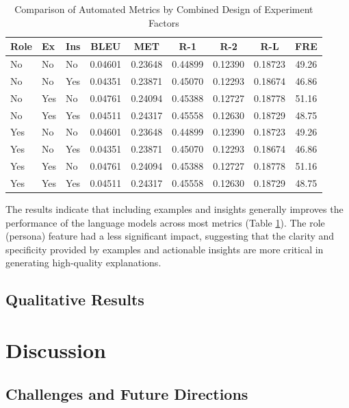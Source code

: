 \documentclass[preprint,12pt]{elsarticle}
\begin{document}
\begin{table}[h]
\centering
\label{table:design_experiment_combined}
\begin{tabular}{|l|l|l|c|c|c|c|c|c|}
\hline
\textbf{Role} & \textbf{Ex} & \textbf{Ins} & \textbf{BLEU} & \textbf{MET} & \textbf{R-1} & \textbf{R-2} & \textbf{R-L} & \textbf{FRE} \\
\hline
No  & No  & No  & 0.04601 & 0.23648 & 0.44899 & 0.12390 & 0.18723 & 49.26 \\
No  & No  & Yes & 0.04351 & 0.23871 & 0.45070 & 0.12293 & 0.18674 & 46.86 \\
No  & Yes & No  & 0.04761 & 0.24094 & 0.45388 & 0.12727 & 0.18778 & 51.16 \\
No  & Yes & Yes & 0.04511 & 0.24317 & 0.45558 & 0.12630 & 0.18729 & 48.75 \\
Yes & No  & No  & 0.04601 & 0.23648 & 0.44899 & 0.12390 & 0.18723 & 49.26 \\
Yes & No  & Yes & 0.04351 & 0.23871 & 0.45070 & 0.12293 & 0.18674 & 46.86 \\
Yes & Yes & No  & 0.04761 & 0.24094 & 0.45388 & 0.12727 & 0.18778 & 51.16 \\
Yes & Yes & Yes & 0.04511 & 0.24317 & 0.45558 & 0.12630 & 0.18729 & 48.75 \\
\hline
\end{tabular}
\caption{Comparison of Automated Metrics by Combined Design of Experiment Factors}

\end{table}

The results indicate that including examples and insights generally improves the performance of the language models across most metrics (Table \ref{table:design_experiment_combined}). The role (persona) feature had a less significant impact, suggesting that the clarity and specificity provided by examples and actionable insights are more critical in generating high-quality explanations.

\subsection{Qualitative Results}


\section{Discussion}
\label{sec5}

\subsection{Challenges and Future Directions}
\end{document}
